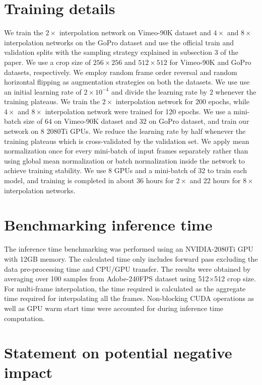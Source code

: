 \documentclass[10pt,twocolumn,letterpaper]{article}
\newcommand{\twox}{$2\times$}
\newcommand{\fourx}{$4\times$}
\newcommand{\eightx}{$8\times$}
\newcommand{\stimes}{{\times}}
\begin{document}
\section{Training details}
\label{appendix:training_details}

We train the \twox{} interpolation network on Vimeo-90K dataset and \fourx{} and \eightx{} interpolation networks on the GoPro dataset and use the official train and validation splits with the sampling strategy explained in subsection 3 of the paper. We use a crop size of $256 \stimes 256$ and $512 \stimes 512$ for Vimeo-90K and GoPro datasets, respectively. We employ random frame order reversal and random horizontal flipping as augmentation strategies on both the datasets. We use use an initial learning rate of $2\times10^{-4}$ and divide the learning rate by $2$ whenever the training plateaus. We train the \twox{} interpolation network for 200 epochs, while \fourx{} and \eightx{} interpolation network were trained for 120 epochs. We use a mini-batch size of $64$ on Vimeo-90K dataset and $32$ on GoPro dataset, and train our network on $8$ 2080Ti GPUs. We reduce the learning rate by half whenever the training plateaus which is cross-validated by the validation set. We apply mean normalization once for every mini-batch of input frames separately rather than using global mean normalization or batch normalization inside the network to achieve training stability. We use 8 GPUs and a mini-batch of 32 to train each model, and training is completed in about 36 hours for \twox{} and 22 hours for \eightx{} interpolation networks. 


\section{Benchmarking inference time}
\label{appendix:inference_time}

The inference time benchmarking was performed using an NVIDIA-2080Ti GPU with 12GB memory. The calculated time only includes forward pass excluding the data pre-processing time and CPU/GPU transfer. The results were obtained by averaging over 100 samples from Adobe-240FPS dataset using 512$\times$512 crop size. For multi-frame interpolation, the time required is calculated as the aggregate time required for interpolating all the frames. Non-blocking CUDA operations as well as GPU warm start time were accounted for during inference time computation.

\section{Statement on potential negative impact}
\label{sec:negImpact}
\end{document}
